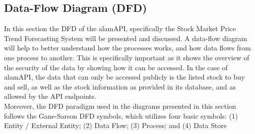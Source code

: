 \subsection{Data-Flow Diagram (DFD)}
\label{subsec:dfd}
In this section the DFD of the alamAPI, specifically the Stock 
Market Price Trend Forecasting System will be presented and discussed. 
A data-flow diagram will help to better understand how the processes works, 
and how data flows from one process to another. This is specifically important 
as it shows the overview of the security of the data by showing how it can be 
accessed. In the case of alamAPI, the data that can only be accessed publicly is 
the listed stock to buy and sell, as well as the stock information as provided 
in its database, and as allowed by the API endpoints.
\vspace{0.5cm}
\\Moreover, the DFD paradigm used in the diagrams presented in this 
section follows the Gane-Sarson DFD symbols, which utilizes four basic symbols: 
(1) Entity / External Entity; 
(2) Data Flow; 
(3) Process; and 
(4) Data Store 
\cite{VisualParadigm}
